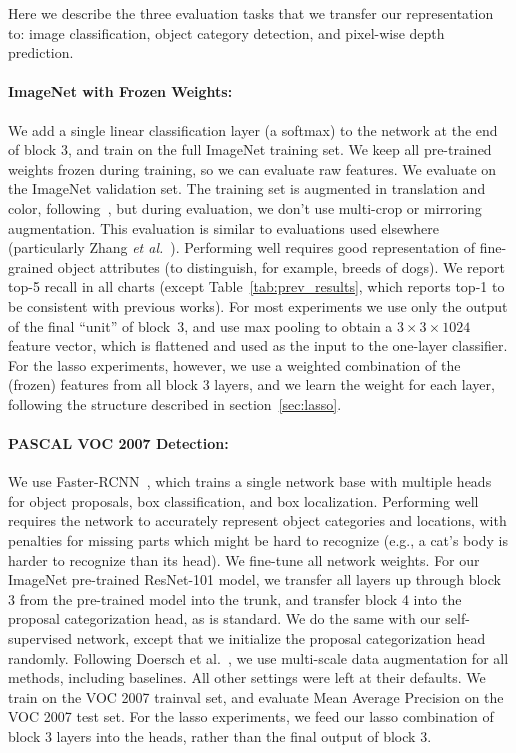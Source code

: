 \documentclass[10pt,twocolumn,letterpaper]{article}
\begin{document}
\label{sec:evaluation}

Here we describe the three evaluation tasks that we transfer our representation to: image classification, object
category detection, and pixel-wise depth prediction.



\paragraph{ImageNet with Frozen Weights:}
We add a single linear classification layer (a softmax) to the network at the end of block 3, and train on the full ImageNet training set.
We keep all pre-trained weights frozen during training, so we can evaluate raw features.
We evaluate on the ImageNet validation set.  
The training set is augmented in translation and color, following~\cite{szegedy2016inception}, but during evaluation, we don't use multi-crop or mirroring augmentation.
This evaluation is similar to evaluations used elsewhere (particularly Zhang {\it et al.}~\cite{zhang2016colorful}).
Performing well requires good representation of fine-grained object attributes (to distinguish, for example, breeds of dogs).
We report top-5 recall in all charts (except Table~\ref{tab:prev_results}, which reports top-1 to be consistent with previous works).
For most experiments we use only the output of the final ``unit'' of block~3, and use max pooling to obtain a $3 \times 3 \times 1024$ feature vector, which is flattened and used as the input to the one-layer classifier.
For the lasso experiments, however, we use a weighted combination of the (frozen) features from all block 3 layers, and we learn the weight for each layer, following the structure described in section~\ref{sec:lasso}.


\paragraph{PASCAL VOC 2007 Detection:}
We use Faster-RCNN~\cite{ren2015faster}, which trains a single network base with multiple heads for object proposals, box classification, and box localization.
Performing well requires the network to accurately represent object categories and locations, with penalties for missing parts which might be hard to recognize (e.g., a cat's body is harder to recognize than its head).
We fine-tune all network weights.
For our ImageNet pre-trained ResNet-101 model, we transfer all layers up through block 3 from the pre-trained model into the trunk, and transfer block 4 into the proposal categorization head, as is standard.  
We do the same with our self-supervised network, except that we initialize the proposal categorization head randomly.
Following Doersch et al.~\cite{doersch2015unsupervised}, we use multi-scale data augmentation for all methods, including baselines.
All other settings were left at their defaults.
We train on the VOC 2007 trainval set, and evaluate Mean Average Precision on the VOC 2007 test set.
For the lasso experiments, we feed our lasso combination of block 3 layers into the heads, rather than the final output of block 3.
\end{document}
